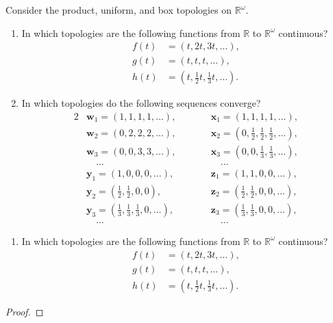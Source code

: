\documentclass[a4paper,10pt]{article}
\newcommand{\bx}{\mathbf{x}}
\newcommand{\by}{\mathbf{y}}
\newcommand{\bz}{\mathbf{z}}
\newcommand{\bw}{\mathbf{w}}
\newcommand{\RR}{\mathbb{R}}
\begin{document}
\begin{exercise}[ID=2.20.4]
    Consider the product, uniform, and box topologies on $\RR^\omega$.
    \begin{enumerate}[label={(\alph*)}, align=left, leftmargin=\parindent, listparindent=\parindent, labelwidth=0pt, itemindent=!]
        \item In which topologies are the following functions from $\RR$ to $\RR^\omega$ continuous?
        \begin{align*}
            f(t) &= (t, 2t, 3t, \ldots), \\
            g(t) &= (t, t, t, \ldots), \\
            h(t) &= (t, \tfrac{1}{2} t, \tfrac{1}{3} t, \ldots).
        \end{align*}
        \item In which topologies do the following sequences converge?
        \begin{alignat*}{2}
            & \bw_1 = (1, 1, 1, 1, \ldots),\qquad   & & \bx_1 = (1, 1, 1, 1, \ldots), \\
            & \bw_2 = (0, 2, 2, 2, \ldots),\qquad   & & \bx_2 = (0, \tfrac{1}{2}, \tfrac{1}{2}, \tfrac{1}{2}, \ldots), \\
            & \bw_3 = (0, 0, 3, 3, \ldots),\qquad   & & \bx_3 = (0, 0, \tfrac{1}{3}, \tfrac{1}{3}, \ldots), \\
            & \quad\ldots                           & & \quad\ldots \\
            & \by_1 = (1, 0, 0, 0, \ldots),\qquad   & & \bz_1 = (1, 1, 0, 0, \ldots), \\
            & \by_2 = (\tfrac{1}{2}, \tfrac{1}{2}, 0, 0),                       & & \bz_2 = (\tfrac{1}{2}, \tfrac{1}{2}, 0, 0, \ldots), \\
            & \by_3 = (\tfrac{1}{3}, \tfrac{1}{3}, \tfrac{1}{3}, 0, \ldots),    & & \bz_3 = (\tfrac{1}{3}, \tfrac{1}{3}, 0, 0, \ldots), \\
            & \quad\ldots                                                       & & \quad\ldots
        \end{alignat*}
    \end{enumerate}
\end{exercise}

\begin{solution}
    \begin{enumerate}[label={(\alph*)}, align=left, leftmargin=\parindent, listparindent=\parindent, labelwidth=0pt, itemindent=!]
        \item In which topologies are the following functions from $\RR$ to $\RR^\omega$ continuous?
        \begin{align*}
            f(t) &= (t, 2t, 3t, \ldots), \\
            g(t) &= (t, t, t, \ldots), \\
            h(t) &= (t, \tfrac{1}{2} t, \tfrac{1}{3} t, \ldots).
        \end{align*}
    \end{enumerate}
    \begin{proof}
    \end{proof}
\end{solution}
\end{document}
